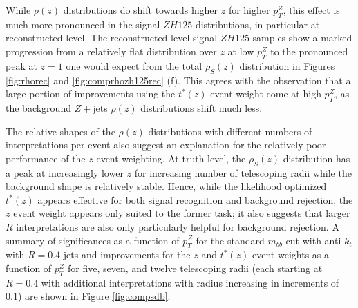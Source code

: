 While $\rho\left(z\right)$ distributions do shift towards higher $z$ for higher $p_T^Z$, this effect is much more pronounced in the signal $ZH125$ distributions, in particular at reconstructed level.  The reconstructed-level signal $ZH125$ samples show a marked progression from a relatively flat distribution over $z$ at low $p_T^Z$ to the pronounced peak at $z=1$ one would expect from the total $\rho_S\left(z\right)$ distribution in Figures \ref{fig:rhorec} and \ref{fig:comprhozh125rec} (f).  This agrees with the observation that a large portion of improvements using the $t^*\left(z\right)$ event weight come at high $p_T^Z$, as the background $Z+$jets $\rho\left(z\right)$ distributions shift much less.

The relative shapes of the $\rho\left(z\right)$ distributions with different numbers of interpretations per event also suggest an explanation for the relatively poor performance of the $z$ event weighting.  At truth level, the $\rho_S\left(z\right)$ distribution has a peak at increasingly lower $z$ for increasing number of telescoping radii while the background shape is relatively stable.  Hence, while the likelihood optimized $t^*\left(z\right)$ appears effective for both signal recognition and background rejection, the $z$ event weight appears only suited to the former task; it also suggests that larger $R$ interpretations are also only particularly helpful for background rejection.  A summary of significances as a function of $p_T^Z$ for the standard $m_{bb}$ cut with anti-$k_t$ with $R=0.4$ jets and improvements for the $z$ and $t^*\left(z\right)$ event weights as a function of $p_T^Z$ for five, seven, and twelve telescoping radii (each starting at $R=0.4$ with additional interpretations with radius increasing in increments of 0.1) are shown in Figure \ref{fig:compsdb}.

